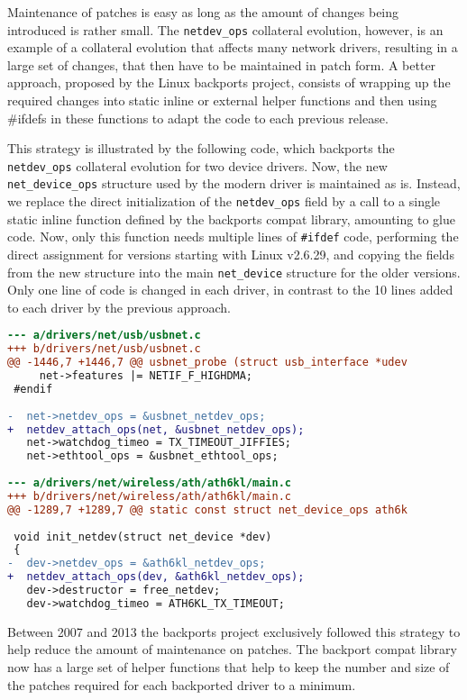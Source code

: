 Maintenance of patches is easy as long as the amount of changes being
introduced is rather small. The {\tt netdev\_\-ops} collateral evolution,
however, is an example of a collateral evolution that affects many network
drivers, resulting in a large set of changes, that then have to be
maintained in patch form.  A better approach, proposed by the Linux
backports project, consists of wrapping up the required changes into static
inline or external helper functions and then using \#ifdefs in these
functions to adapt the code to each previous release.

This strategy is illustrated by the following code, which backports the
{\tt netdev\_\-ops} collateral evolution for two device drivers.  Now, the
new {\tt net\_\-device\_\-ops} structure used by the modern driver is
maintained as is.  Instead, we replace the direct initialization of the
{\tt netdev\_\-ops} field by a call to a single static inline function
defined by the backports compat library, amounting to glue code.  Now, only
this function needs multiple lines of \verb-#ifdef- code, performing the
direct assignment for versions starting with Linux v2.6.29, and copying the
fields from the new structure into the main {\tt net\_\-device} structure
for the older versions.  Only one line of code is changed in each driver,
in contrast to the 10 lines added to each driver by the previous approach.

\begin{lstlisting}[language=diff]
--- a/drivers/net/usb/usbnet.c
+++ b/drivers/net/usb/usbnet.c
@@ -1446,7 +1446,7 @@ usbnet_probe (struct usb_interface *udev
     net->features |= NETIF_F_HIGHDMA;
 #endif
 
-  net->netdev_ops = &usbnet_netdev_ops;
+  netdev_attach_ops(net, &usbnet_netdev_ops);
   net->watchdog_timeo = TX_TIMEOUT_JIFFIES;
   net->ethtool_ops = &usbnet_ethtool_ops;
 
--- a/drivers/net/wireless/ath/ath6kl/main.c
+++ b/drivers/net/wireless/ath/ath6kl/main.c
@@ -1289,7 +1289,7 @@ static const struct net_device_ops ath6k
 
 void init_netdev(struct net_device *dev)
 {
-  dev->netdev_ops = &ath6kl_netdev_ops;
+  netdev_attach_ops(dev, &ath6kl_netdev_ops);
   dev->destructor = free_netdev;
   dev->watchdog_timeo = ATH6KL_TX_TIMEOUT;
\end{lstlisting}

Between 2007 and 2013 the backports project exclusively followed this
strategy to help reduce the amount of maintenance on patches. The backport
compat library now has a large set of helper functions that help to keep the
number and size of the patches required for each backported driver to a
minimum.

